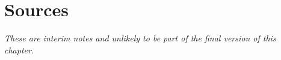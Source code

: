 \section{Sources}
\emph{These are interim notes and unlikely to be part of the final version of this chapter.}

